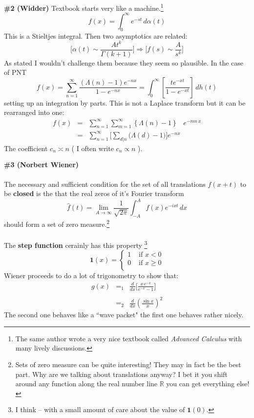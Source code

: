 \documentclass[12pt]{article}
\begin{document}
\noindent \textbf{\#2 (Widder)} Textbook starts very like a machine.\footnote{The same author wrote a very nice textbook called \textit{Advanced Calculus} with many lively discussions.}
$$ f(x) = \int_0^\infty e^{-st} \, d \alpha(t) $$
This is a Stieltjes integral.  Then two asymptotics are related:
$$
\Bigg[ \alpha(t) \sim \frac{A t^k}{\Gamma(k+1)}\Bigg] \Rightarrow \Bigg[ f(s) \sim \frac{A}{s^k} \Bigg]
 $$
 As stated I wouldn't challenge them because they seem so plausible.   In the case of PNT
 $$
f(x) = \sum_{n=1}^\infty \frac{(\Lambda(n) - 1)e^{-nx}}{1 - e^{-nx}} = \int_0^\infty \left[\frac{t e^{-xt}}{1 - e^{-xt}} \right]\, dh(t)
  $$
setting up an {\color{green}integration by parts}.  This is not a Laplace transform but it can be rearranged into one:
\begin{eqnarray*} f(x) &=& \sum_{n=1}^\infty \sum_{m=1}^\infty \left\{ \Lambda(n) - 1\right\} \;\;\;e^{-mn\,x}\\ 
&=& \sum_{n=1}^\infty \Bigg[ \sum_{d|n} \big( \Lambda(d)-1 \big) \Bigg] e^{-nx}\end{eqnarray*}
The coefficient $c_n \asymp n$ ( I often write $c_n \propto n$ ).  \newpage

\noindent \textbf{\#3 (Norbert Wiener)} \\ \\The necessary and sufficient condition for the set of all translations $f(x+t)$ to be {\color{red!50!white}\textbf{closed}} is the that the real zeros of it's Fourier transform
$$ \hat{f}(t) = \lim_{A \to \infty} \frac{1}{\sqrt{2\pi}} \int_{-A}^A f(x) e^{-ixt} \, dx $$
should form a set of zero measure.\footnote{Sets of zero measure can be quite interesting!  They may in fact be the best part.  Why are we talking about translations anyway?  I bet it you shift around any function along the real number line $\mathbb{R}$ you can get everything else!} \\ \\ The \textbf{step function} cerainly has this property
\footnote{I think -- with a small amount of care about the value of $\mathbf{1}(0)$.}   
$$ \mathbf{1}(x) = \left\{ 
\begin{array}{cc}
1 & \text{ if } x < 0 \\
0 & \text{ if } x \geq 0 \\
 \end{array} \right. $$
Wiener proceeds to do a lot of trigonometry to show that:
\begin{eqnarray*}
g(x) &=_1&  \frac{d}{dx} \bigg[\frac{x \, e^{-x}}{e^{-x}-1}\bigg] \\ \\
&=_2&  \frac{d}{dx} \left( \frac{\sin x}{x}\right)^2
\end{eqnarray*}
The second one behaves like a ``wave packet" the first one behaves rather nicely.
\end{document}
